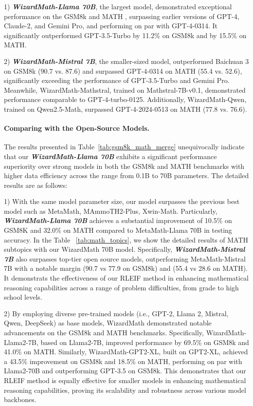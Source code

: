 1) \emph{\textbf{WizardMath-Llama 70B}}, the largest model, demonstrated exceptional performance on the GSM8k and MATH , surpassing earlier versions of GPT-4, Claude-2, and Gemini Pro, and performing on par with GPT-4-0314. It significantly outperformed GPT-3.5-Turbo by 11.2\% on GSM8k and by 15.5\% on MATH.

2) \emph{\textbf{WizardMath-Mistral 7B}}, the smaller-sized model, outperformed Baichuan 3 on GSM8k (90.7 vs. 87.6) and surpassed GPT-4-0314 on MATH (55.4 vs. 52.6), significantly exceeding the performance of GPT-3.5-Turbo and Gemini Pro. Meanwhile, WizardMath-Mathstral, trained on Mathstral-7B-v0.1, demonstrated performance comparable to GPT-4-turbo-0125. Additionally, WizardMath-Qwen, trained on Qwen2.5-Math, surpassed GPT-4-2024-0513 on MATH (77.8 vs. 76.6).

\paragraph{Comparing with the Open-Source Models.} The results presented in Table~\ref{tab:gsm8k_math_merge} unequivocally indicate that our \emph{\textbf{WizardMath-Llama 70B}} exhibits a significant performance superiority over strong models in both the GSM8k and MATH benchmarks with higher data efficiency across the range from 0.1B to 70B parameters. The detailed results are as follows:

1) With the same model parameter size, our model surpasses the previous best model such as MetaMath, MAmmoTH2-Plus, Xwin-Math. Particularly, \emph{\textbf{WizardMath-Llama 70B}} achieves a substantial improvement of 10.5\% on GSM8K and 32.0\% on MATH compared to MetaMath-Llama 70B in testing accuracy.  In the Table ~\ref{tab:math_topics}, we show the detailed results of MATH subtopics with our WizardMath 70B model.  Specifically, \emph{\textbf{WizardMath-Mistral 7B}} also surpasses top-tier open source models, outperforming MetaMath-Mistral 7B with a notable margin (90.7 vs 77.9 on GSM8k) and (55.4 vs 28.6 on MATH). It demonstrats the effectiveness of our RLEIF method in enhancing mathematical reasoning capabilities across a range of problem difficulties, from grade to high school levels.

2) By employing diverse pre-trained models (i.e., GPT-2, Llama 2, Mistral, Qwen, DeepSeek) as base models, WizardMath demonstrated notable advancements on the GSM8k and MATH benchmarks. Specifically, WizardMath-Llama2-7B, based on Llama2-7B, improved performance by 69.5\% on GSM8k and 41.0\% on MATH. Similarly, WizardMath-GPT2-XL, built on GPT2-XL, achieved a 43.5\% improvement on GSM8k and 18.5\% on MATH, performing on par with Llama2-70B and outperforming GPT-3.5 on GSM8k. This demonstrates that our RLEIF method is equally effective for smaller models in enhancing mathematical reasoning capabilities, proving its scalability and robustness across various model backbones.

